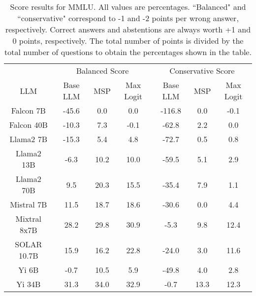 \begin{table*}
\centering
\begin{tabular}{c|c|c|c|c|c|c}
& \multicolumn{3}{c|}{Balanced Score} & \multicolumn{3}{c}{Conservative Score} \\ 
LLM & Base LLM & MSP & Max Logit & Base LLM & MSP & Max Logit\\ \hline
Falcon 7B & -45.6 & 0.0 & 0.0 & -116.8 & 0.0 & -0.1\\
Falcon 40B & -10.3 & 7.3 & -0.1 & -62.8 & 2.2 & 0.0\\
Llama2 7B & -15.3 & 5.4 & 4.8 & -72.7 & 0.5 & 0.8\\
Llama2 13B & -6.3 & 10.2 & 10.0 & -59.5 & 5.1 & 2.9\\
Llama2 70B & 9.5 & 20.3 & 15.5 & -35.4 & 7.9 & 1.1\\
Mistral 7B & 11.5 & 18.7 & 18.6 & -30.6 & 0.0 & 4.4\\
Mixtral 8x7B & 28.2 & 29.8 & 30.9 & -5.3 & 9.8 & 12.4\\
SOLAR 10.7B & 15.9 & 16.2 & 22.8 & -24.0 & 3.0 & 11.6\\
Yi 6B & -0.7 & 10.5 & 5.9 & -49.8 & 4.0 & 2.8\\
Yi 34B & 31.3 & 34.0 & 32.9 & -0.7 & 13.3 & 12.3\\
\hline
\end{tabular}
\caption{Score results for MMLU. All values are percentages. ``Balanced" and ``conservative" correspond to -1 and -2 points per wrong answer, respectively. Correct answers and abstentions are always worth +1 and 0 points, respectively. The total number of points is divided by the total number of questions to obtain the percentages shown in the table.}
\label{tab:mmlu_score}
\end{table*}
